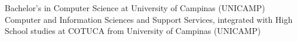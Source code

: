 %
%
%


\begin{scholarship}
					{Bachelor's in Computer Science at University of Campinas (UNICAMP)}
	\emptySeparator
					{Computer and Information Sciences and Support Services, integrated with High School
					studies at COTUCA from University of Campinas (UNICAMP)}
\end{scholarship}
